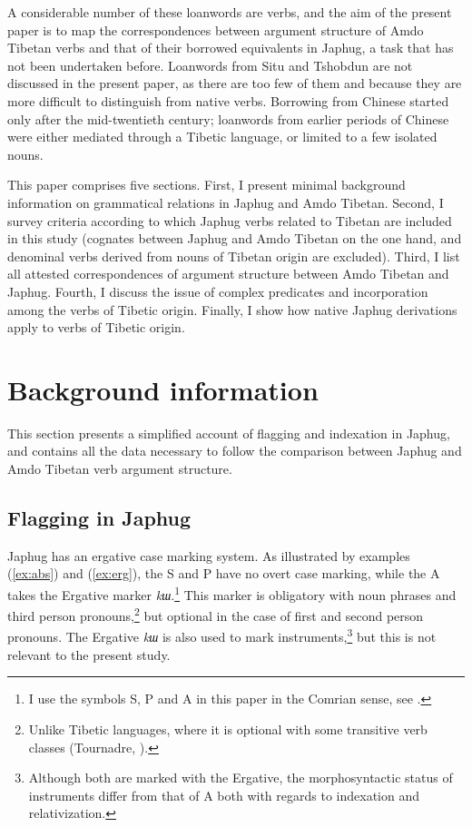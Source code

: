 \documentclass[oneside,a4paper,11pt]{article}
\newcommand{\ipa}[1]{{\phon\textit{\mbox{#1}}}} %
\newcommand{\refb}[1]{(\ref{#1})}
\begin{document}
A considerable number of these loanwords are verbs, and the aim of the present paper is to map the correspondences between argument structure of Amdo Tibetan verbs and that of their borrowed equivalents in Japhug, a task that has not been undertaken before. Loanwords from Situ and Tshobdun are not discussed in the present paper, as there are too few of them and because they are more difficult to distinguish from native verbs. Borrowing from Chinese started only after the mid-twentieth century; loanwords from earlier periods of Chinese were either mediated through a Tibetic language, or limited to a few isolated nouns.

This paper comprises five sections. First, I present minimal background information on grammatical relations in Japhug and Amdo Tibetan. Second, I survey criteria according to which Japhug verbs related to Tibetan are included in this study (cognates between Japhug and Amdo Tibetan on the one hand, and denominal verbs derived from nouns of Tibetan origin are excluded). Third, I list all attested correspondences of argument structure between Amdo Tibetan and Japhug. Fourth, I discuss the issue of complex predicates and incorporation among the verbs of Tibetic origin. Finally, I show how native Japhug derivations apply to verbs of Tibetic origin.

\section{Background information}
This section presents a simplified account of flagging and indexation in Japhug, and contains all the data necessary to follow the comparison between Japhug and Amdo Tibetan verb argument structure.

\subsection{Flagging in Japhug}
Japhug has an ergative case marking system. As illustrated by examples \refb{ex:abs} and \refb{ex:erg}, the S and P have no overt case marking, while the A takes the Ergative marker \ipa{kɯ}.\footnote{I use the symbols S, P and A in this paper in the Comrian sense, see \citet{haspelmath11SAPTR}.} This marker is obligatory with noun phrases and third person pronouns,\footnote{Unlike Tibetic languages, where it is optional with some transitive verb classes (Tournadre, \citeyear{tournadre91}).} but optional in the case of first and second person pronouns.  The Ergative \ipa{kɯ} is also used to mark instruments,\footnote{Although both are marked with the Ergative, the morphosyntactic status of instruments differ from that of A both with regards to indexation and relativization.} but this is not relevant to the present study.
\end{document}
